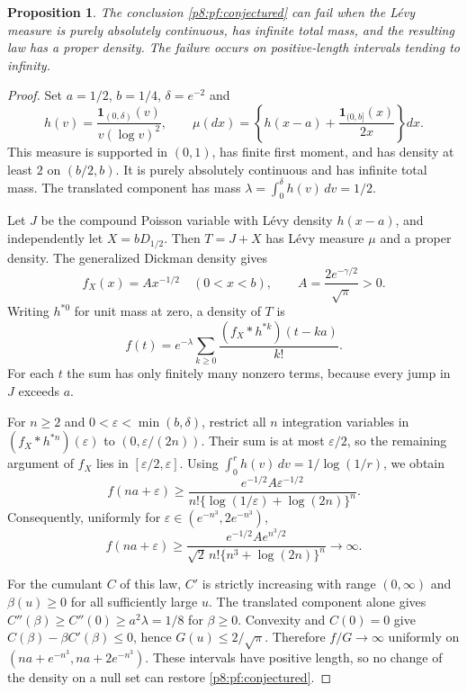 \documentclass[11pt,a4paper]{article}
\newtheorem{proposition}[theorem]{Proposition}
\theoremstyle{definition}
\theoremstyle{remark}
\numberwithin{equation}{section}
\begin{document}
\begin{proposition}\label{p8:pf:nonatomic-proper}
The conclusion \eqref{p8:pf:conjectured} can fail when the L\'evy measure is
purely absolutely continuous, has infinite total mass, and the resulting
law has a proper density. The failure occurs on positive-length
intervals tending to infinity.
\end{proposition}
\begin{proof}
Set $a=1/2$, $b=1/4$, $\delta=e^{-2}$ and
\[
 h(v)=\frac{\mathbf1_{(0,\delta)}(v)}{v(\log v)^2},
 \qquad
 \mu(dx)=\left\{h(x-a)+\frac{\mathbf1_{(0,b]}(x)}{2x}\right\}dx.
\]
This measure is supported in $(0,1)$, has finite first moment, and has
density at least $2$ on $(b/2,b)$. It is purely absolutely continuous
and has infinite total mass. The translated component has mass
$\lambda=\int_0^\delta h(v)\,dv=1/2$.

Let $J$ be the compound Poisson variable with L\'evy density $h(x-a)$,
and independently let $X=bD_{1/2}$. Then $T=J+X$ has L\'evy measure
$\mu$ and a proper density. The generalized Dickman density gives
\[
 f_X(x)=A x^{-1/2}\quad(0<x<b),\qquad
 A=\frac{2e^{-\gamma/2}}{\sqrt\pi}>0.
\]
Writing $h^{*0}$ for unit mass at zero, a density of $T$ is
\[
 f(t)=e^{-\lambda}\sum_{k\geq0}
          \frac{(f_X*h^{*k})(t-ka)}{k!}.
\]
For each $t$ the sum has only finitely many nonzero terms, because every
jump in $J$ exceeds $a$.

For $n\geq2$ and $0<\varepsilon<\min(b,\delta)$, restrict all $n$
integration variables in $(f_X*h^{*n})(\varepsilon)$ to
$(0,\varepsilon/(2n))$. Their sum is at most $\varepsilon/2$, so the
remaining argument of $f_X$ lies in $[\varepsilon/2,\varepsilon]$.
Using $\int_0^r h(v)\,dv=1/\log(1/r)$, we obtain
\[
 f(na+\varepsilon)\geq
 \frac{e^{-1/2}A\varepsilon^{-1/2}}
 {n!\{\log(1/\varepsilon)+\log(2n)\}^{n}}.
\]
Consequently, uniformly for
$\varepsilon\in(e^{-n^3},2e^{-n^3})$,
\[
 f(na+\varepsilon)\geq
 \frac{e^{-1/2}A e^{n^3/2}}
 {\sqrt2\,n!\{n^3+\log(2n)\}^{n}}
 \longrightarrow\infty.
\]

For the cumulant $C$ of this law, $C'$ is strictly increasing with range
$(0,\infty)$ and $\beta(u)\geq0$ for all sufficiently large $u$.
The translated component alone gives
$C''(\beta)\geq C''(0)\geq a^2\lambda=1/8$ for $\beta\geq0$.
Convexity and $C(0)=0$ give $C(\beta)-\beta C'(\beta)\leq0$, hence
$G(u)\leq2/\sqrt\pi$. Therefore $f/G\to\infty$ uniformly on
$(na+e^{-n^3},na+2e^{-n^3})$. These intervals have positive length,
so no change of the density on a null set can restore
\eqref{p8:pf:conjectured}.
\end{proof}
\end{document}
